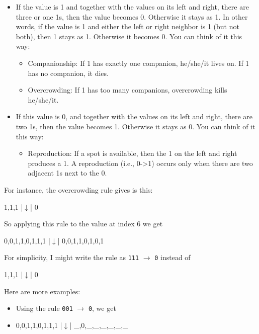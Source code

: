 \begin{itemize}
\item
  If the value is 1 and together with the values on its left and right, there are three or one 1s, then the value becomes 0. Otherwise it stays as 1. In other words, if the value is 1 and either the left or right neighbor is 1 (but not both), then 1 stays as 1. Otherwise it becomes 0. You can think of it this way:

  \begin{itemize}
  \item
    Companionship: If 1 has exactly one companion, he/she/it lives on. If 1 has no companion, it dies.
  \item
    Overcrowding: If 1 has too many companions, overcrowding kills he/she/it.
  \end{itemize}
\item
  If this value is 0, and together with the values on its left and right, there are two 1s, then the value becomes 1. Otherwise it stays as 0. You can think of it this way:

  \begin{itemize}
  \item
    Reproduction: If a spot is available, then the 1 on the left and right produces a 1. A reproduction (i.e., 0-\textgreater1) occurs only when there are two adjacent 1s next to the 0.
  \end{itemize}
\end{itemize}

For instance, the overcrowding rule gives is this:

\begin{consolethree}[escapeinside=||]
1,1,1
  |$\downarrow$|
  0
\end{consolethree}

So applying this rule to the value at index 6 we get

\begin{consolethree}[escapeinside=||]
0,0,1,1,0,1,1,1
            |$\downarrow$|
0,0,1,1,0,1,0,1
\end{consolethree}

For simplicity, I might write the rule as \verb!111! $\rightarrow$ \verb!0! instead of

\begin{consolethree}[escapeinside=||]
1,1,1
  |$\downarrow$|
  0
\end{consolethree}

Here are more examples:

\begin{itemize}

\item
  Using the rule \texttt{001} $\rightarrow$ \texttt{0}, we get
\item
\begin{consolethree}[escapeinside=||]
0,0,1,1,0,1,1,1
  |$\downarrow$|
_,0,_,_,_,_,_,_
\end{consolethree}
\end{itemize}


